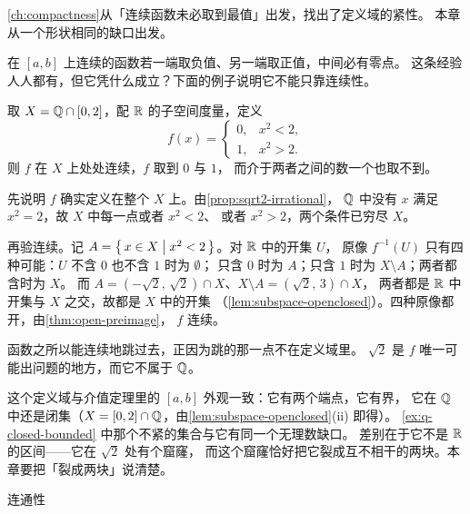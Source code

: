 \cref{ch:compactness}从「连续函数未必取到最值」出发，找出了定义域的紧性。
本章从一个形状相同的缺口出发。

在 \([a,b]\) 上连续的函数若一端取负值、另一端取正值，中间必有零点。
这条经验人人都有，但它凭什么成立？下面的例子说明它不能只靠连续性。

\begin{example}[连续却跳过全部中间值]
  \label{ex:q-jump}
  取 \(X = \mathbb{Q} \cap [0,2]\)，配 \(\mathbb{R}\) 的子空间度量，定义
  \begin{equation}
    \label{eq:q-jump}
    f(x) =
    \begin{cases}
      0, & x^{2} < 2, \\
      1, & x^{2} > 2 .
    \end{cases}
  \end{equation}
  则 \(f\) 在 \(X\) 上处处连续，\(f\) 取到 \(0\) 与 \(1\)，
  而介于两者之间的数一个也取不到。
  \begin{worked}
    先说明 \(f\) 确实定义在整个 \(X\) 上。由\cref{prop:sqrt2-irrational}，
    \(\mathbb{Q}\) 中没有 \(x\) 满足 \(x^{2}=2\)，故 \(X\) 中每一点或者 \(x^{2}<2\)、
    或者 \(x^{2}>2\)，两个条件已穷尽 \(X\)。

    再验连续。记 \(A = \left\{\,x \in X \;\middle|\; x^{2}<2\,\right\}\)。对 \(\mathbb{R}\) 中的开集 \(U\)，
    原像 \(f^{-1}(U)\) 只有四种可能：\(U\) 不含 \(0\) 也不含 \(1\) 时为 \(\emptyset\)；
    只含 \(0\) 时为 \(A\)；只含 \(1\) 时为 \(X \setminus A\)；两者都含时为 \(X\)。
    而 \(A = (-\sqrt2,\,\sqrt2) \cap X\)、\(X \setminus A = (\sqrt2,\,3) \cap X\)，
    两者都是 \(\mathbb{R}\) 中开集与 \(X\) 之交，故都是 \(X\) 中的开集
    （\cref{lem:subspace-openclosed}）。四种原像都开，由\cref{thm:open-preimage}，
    \(f\) 连续。

    函数之所以能连续地跳过去，正因为跳的那一点不在定义域里。
    \(\sqrt2\) 是 \(f\) 唯一可能出问题的地方，而它不属于 \(\mathbb{Q}\)。
  \end{worked}
\end{example}

这个定义域与介值定理里的 \([a,b]\) 外观一致：它有两个端点，它有界，
它在 \(\mathbb{Q}\) 中还是闭集（\(X = [0,2] \cap \mathbb{Q}\)，由\cref{lem:subspace-openclosed}(ii) 即得）。
\cref{ex:q-closed-bounded} 中那个不紧的集合与它有同一个无理数缺口。
差别在于它不是 \(\mathbb{R}\) 的区间——它在 \(\sqrt2\) 处有个窟窿，
而这个窟窿恰好把它裂成互不相干的两块。本章要把「裂成两块」说清楚。

\begin{concept}{连通性}
\end{concept}

